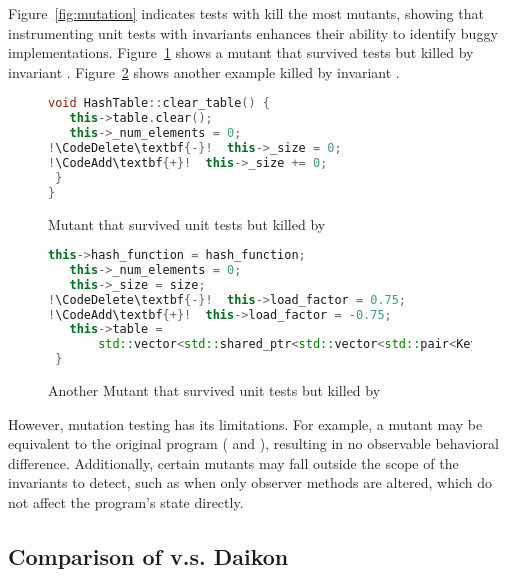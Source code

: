 Figure~\ref{fig:mutation} indicates tests with \tech kill the most mutants, showing that instrumenting unit tests with \tech invariants enhances their ability to identify buggy implementations. Figure~\ref{fig:inv_addition_kill} shows  a mutant that survived tests but killed by \tech invariant . Figure~\ref{fig:inv_addition_kill_const} shows another example killed by \tech invariant .



\begin{figure}[htp]
\centering
\begin{lstlisting}[language=c++, escapechar=!]
 void HashTable::clear_table() {
   this->table.clear();
   this->_num_elements = 0;
!\CodeDelete\textbf{-}!  this->_size = 0;
!\CodeAdd\textbf{+}!  this->_size += 0;
 }
}
\end{lstlisting}
    \caption{Mutant that survived unit tests but killed by \tech}
    \label{fig:inv_addition_kill}
\end{figure}

 \begin{figure}[htp]
\centering
\begin{lstlisting}[language=c++, escapechar=!]
   this->hash_function = hash_function;
   this->_num_elements = 0;
   this->_size = size;
!\CodeDelete\textbf{-}!  this->load_factor = 0.75;
!\CodeAdd\textbf{+}!  this->load_factor = -0.75;
   this->table =
       std::vector<std::shared_ptr<std::vector<std::pair<Key, Value>>>>(size);
 }
\end{lstlisting}
    \caption{Another Mutant that survived unit tests but killed by \tech}
    \label{fig:inv_addition_kill_const}
\end{figure}

However, mutation testing has its limitations. For example, a mutant may be equivalent to the original program (\eg{} and ), resulting in no observable behavioral difference. 
Additionally, certain mutants may fall outside the scope of the invariants to detect, such as when only observer methods are altered, which do not affect the program's state directly.

\subsection{Comparison of \tech v.s. Daikon}
\label{subsec:daikon_compare}



